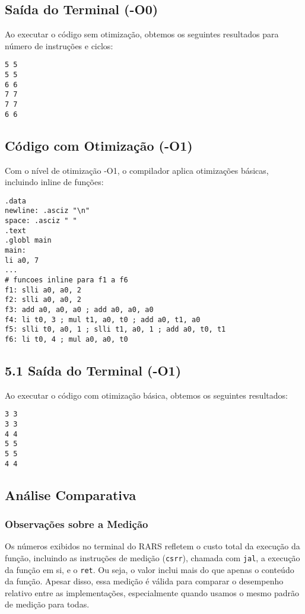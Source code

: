\documentclass[12pt,a4paper]{article}
\begin{document}
\subsection*{Saída do Terminal (-O0)}
Ao executar o código sem otimização, obtemos os seguintes resultados para número de instruções e ciclos:
\begin{verbatim}
5 5
5 5
6 6
7 7
7 7
6 6
\end{verbatim}

\subsection*{Código com Otimização (-O1)}
Com o nível de otimização -O1, o compilador aplica otimizações básicas, incluindo inline de funções:
\begin{lstlisting}[language=Assembly]
.data
newline: .asciz "\n"
space: .asciz " "
.text
.globl main
main:
li a0, 7
...
# funcoes inline para f1 a f6
f1: slli a0, a0, 2
f2: slli a0, a0, 2
f3: add a0, a0, a0 ; add a0, a0, a0
f4: li t0, 3 ; mul t1, a0, t0 ; add a0, t1, a0
f5: slli t0, a0, 1 ; slli t1, a0, 1 ; add a0, t0, t1
f6: li t0, 4 ; mul a0, a0, t0
\end{lstlisting}

\subsection*{5.1 Saída do Terminal (-O1)}
Ao executar o código com otimização básica, obtemos os seguintes resultados:
\begin{verbatim}
3 3
3 3
4 4
5 5
5 5
4 4
\end{verbatim}

\subsection*{Análise Comparativa}
\subsubsection*{Observações sobre a Medição}
Os números exibidos no terminal do RARS refletem o custo total da execução da função, incluindo as instruções de medição (\texttt{csrr}), chamada com \texttt{jal}, a execução da função em si, e o \texttt{ret}. Ou seja, o valor inclui mais do que apenas o conteúdo da função.
Apesar disso, essa medição é válida para comparar o desempenho relativo entre as implementações, especialmente quando usamos o mesmo padrão de medição para todas.
\end{document}
